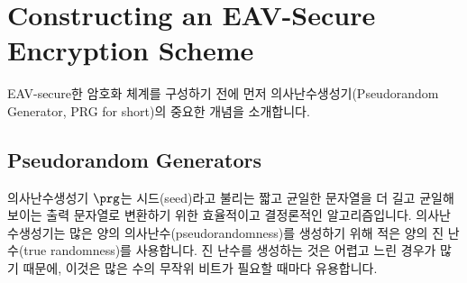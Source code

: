 \section{Constructing an EAV-Secure Encryption Scheme}

EAV-secure한 암호화 체계를 구성하기 전에 먼저 의사난수생성기(Pseudorandom Generator, PRG for short)의
중요한 개념을 소개합니다.


\subsection*{Pseudorandom Generators}

의사난수생성기 $\prg$는 시드(seed)라고 불리는 짧고 균일한 문자열을 더 길고 균일해 보이는 출력 문자열로 변환하기 위한 효율적이고 결정론적인 알고리즘입니다. 의사난수생성기는 많은 양의 의사난수(pseudorandomness)를 생성하기 위해 적은 양의 진 난수(true randomness)를 사용합니다. 진 난수를 생성하는 것은 어렵고 느린 경우가 많기 때문에, 이것은 많은 수의 무작위 비트가 필요할 때마다 유용합니다.



